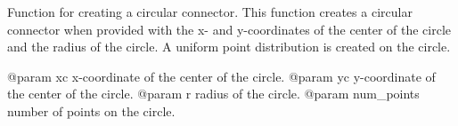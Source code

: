 \begin{DoxyVerb}Function for creating a circular connector.
This function creates a circular connector when provided with
the x- and y-coordinates of the center of the circle and the
radius of the circle.  A uniform point distribution is created on
the circle.

@param xc x-coordinate of the center of the circle.
@param yc y-coordinate of the center of the circle.
@param r radius of the circle.
@param num_points number of points on the circle.
\end{DoxyVerb}
 